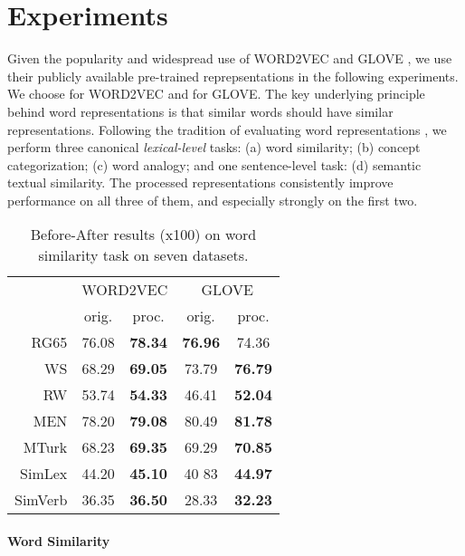 \documentclass{article} \usepackage{acl2017,times}
\begin{document}
\section{Experiments}
\label{sec:experiments}
Given the popularity and widespread use of WORD2VEC \citep{mikolov2013efficient} and GLOVE \citep{pennington2014glove}, we use their publicly available pre-trained reprepsentations in the following experiments. We choose  for WORD2VEC and  for GLOVE. 
The key underlying principle behind word representations is that similar words should have similar representations. Following the tradition of evaluating word representations \citep{schnabel2015evaluation,baroni2014don}, we perform three canonical {\em lexical-level} tasks: (a) word similarity; (b) concept categorization; (c) word analogy; and one {\rm sentence-level} task: (d) semantic textual similarity. The processed representations consistently improve  performance on all three of them, and  especially strongly on the first two. 


\begin{wraptable}{l}{0.48\textwidth}
\vspace{-10pt}
\begin{tabular}{|r||c|c||c|c|}
\hline
\multirow{2}{*}{} & \multicolumn{2}{c||}{WORD2VEC} & \multicolumn{2}{c|}{GLOVE} \\ \cline{2-5} 
                  & orig.      & proc.     & orig.    & proc.    \\ \hline
RG65  &     76.08 &     \bf  78.34  &  \bf 76.96 &  74.36       \\ \hline
WS    &     68.29 &     \bf  69.05 &   73.79  &  \bf 76.79 \\ \hline
RW    &     53.74 &     \bf 54.33 &  46.41   &  \bf 52.04    \\ \hline
MEN   &     78.20 &     \bf 79.08 &  80.49   &  \bf 81.78     \\ \hline
MTurk &     68.23 &     \bf 69.35 &  69.29  &   \bf 70.85\\ \hline
SimLex  &   44.20 &   \bf 45.10   &   40
83 & \bf 44.97      \\ \hline
SimVerb &   36.35 &  \bf 36.50   &  28.33   &  \bf 32.23      \\ \hline
\end{tabular}
\caption{Before-After results (x100) on word similarity task on seven datasets.}
\label{tb:similarity}
\vspace{-10pt}
\end{wraptable}

\paragraph{Word Similarity} 
\end{document}
